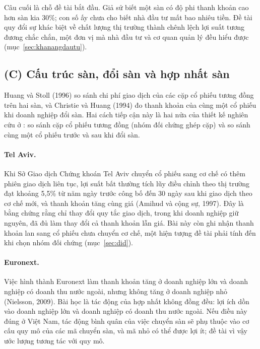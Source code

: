 Câu cuối là chỗ đề tài bắt đầu. Giả sử biết một sàn có độ phi thanh khoản cao hơn sàn kia 30\%; con số ấy chưa cho biết nhà đầu tư mất bao nhiêu tiền. Đề tài quy đổi sự khác biệt về chất lượng thị trường thành chênh lệch lợi suất tương đương chắc chắn, một đơn vị mà nhà đầu tư và cơ quan quản lý đều hiểu được (mục~\ref{sec:khanangdautu}).

\subsection*{(C) Cấu trúc sàn, đổi sàn và hợp nhất sàn}

Huang và Stoll (1996) so sánh chi phí giao dịch của các cặp cổ phiếu tương đồng trên hai sàn, và Christie và Huang (1994) đo thanh khoản của cùng một cổ phiếu khi doanh nghiệp đổi sàn. Hai cách tiếp cận này là hai nửa của thiết kế nghiên cứu ở : so sánh cặp cổ phiếu tương đồng (nhóm đối chứng ghép cặp) và so sánh cùng một cổ phiếu trước và sau khi đổi sàn.

\paragraph{Tel Aviv.} Khi Sở Giao dịch Chứng khoán Tel Aviv chuyển cổ phiếu sang cơ chế có thêm phiên giao dịch liên tục, lợi suất bất thường tích lũy điều chỉnh theo thị trường đạt khoảng 5,5\% từ năm ngày trước công bố đến 30 ngày sau khi giao dịch theo cơ chế mới, và thanh khoản tăng cùng giá (Amihud và cộng sự, 1997). Đây là bằng chứng rằng chỉ thay đổi quy tắc giao dịch, trong khi doanh nghiệp giữ nguyên, đã đủ làm thay đổi cả thanh khoản lẫn giá. Bài này còn ghi nhận thanh khoản lan sang cổ phiếu chưa chuyển cơ chế, một hiện tượng đề tài phải tính đến khi chọn nhóm đối chứng (mục~\ref{sec:did}).

\paragraph{Euronext.} Việc hình thành Euronext làm thanh khoản tăng ở doanh nghiệp lớn và doanh nghiệp có doanh thu nước ngoài, nhưng không tăng ở doanh nghiệp nhỏ (Nielsson, 2009). Bài học là tác động của hợp nhất không đồng đều: lợi ích dồn vào doanh nghiệp lớn và doanh nghiệp có doanh thu nước ngoài. Nếu điều này đúng ở Việt Nam, tác động bình quân của việc chuyển sàn sẽ phụ thuộc vào cơ cấu quy mô của các mã chuyển sàn, và mã nhỏ có thể được lợi ít; đề tài vì vậy ước lượng tương tác với quy mô.

